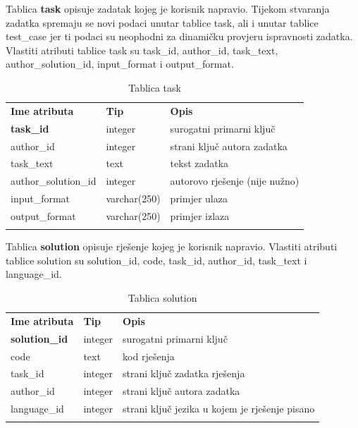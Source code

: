 \documentclass[times, utf8, zavrsni, numeric]{fer}
\begin{document}
		Tablica \textbf{task} opisuje zadatak kojeg je korisnik napravio. Tijekom stvaranja zadatka spremaju se novi podaci unutar tablice task, ali i unutar tablice test\_case jer ti podaci su neophodni za dinamičku provjeru ispravnosti zadatka. Vlastiti atributi tablice task su task\_id, author\_id, task\_text, author\_solution\_id, input\_format i output\_format.
		\begin{table}[H]
			\caption{Tablica task}
			\label{tbl:task}
			\centering
			\begin{tabu} to \textwidth {XXX}
				\tabucline[1.75pt]{-}
				\textbf{Ime atributa} & \textbf{Tip} & \textbf{Opis}\\ 				
				\tabucline[1.75pt]{-}
				\textbf{task\_id} & integer & surogatni primarni ključ\\ \hline
				author\_id & integer & strani ključ autora zadatka\\ \hline
				task\_text & text & tekst zadatka\\ \hline
				author\_solution\_id & integer & autorovo rješenje (nije nužno)\\ \hline
				input\_format & varchar(250) & primjer ulaza\\ \hline
				output\_format & varchar(250) & primjer izlaza\\ \hline
				\tabucline[1.75pt]{-}
			\end{tabu}
		\end{table}
	

		Tablica \textbf{solution} opisuje rješenje kojeg je korisnik napravio. Vlastiti atributi tablice solution su solution\_id, code, task\_id, author\_id, task\_text i language\_id.
		\begin{table}[H]
			\caption{Tablica solution}
			\label{tbl:solution}
			\centering
			\begin{tabu} to \textwidth {XXX}
				\tabucline[1.75pt]{-}
				\textbf{Ime atributa} & \textbf{Tip} & \textbf{Opis}\\ 				
				\tabucline[1.75pt]{-}
				\textbf{solution\_id} & integer & surogatni primarni ključ\\ \hline
				code & text & kod rješenja\\ \hline
				task\_id & integer & strani ključ zadatka rješenja\\ \hline
				author\_id & integer & strani ključ autora zadatka\\ \hline
				language\_id & integer & strani ključ jezika u kojem je rješenje pisano\\ \hline
				\tabucline[1.75pt]{-}
			\end{tabu}
		\end{table}
	
\end{document}
